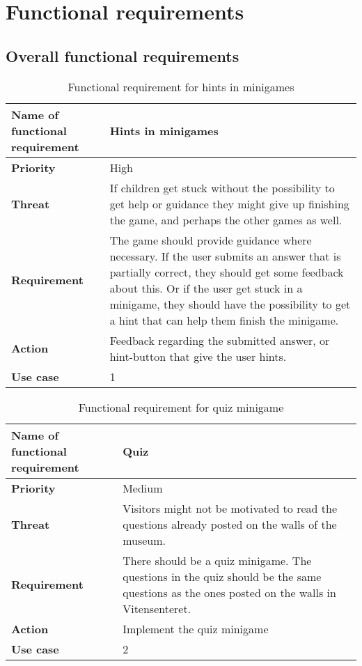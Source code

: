\section{Functional requirements}


\subsection{Overall functional requirements}
\begin{table}[!h]
\caption{Functional requirement for hints in minigames}
\begin{tabular}{ |p{7cm}|p{7cm}| }
\hline
\textbf {Name of functional requirement} & {Hints in minigames} \\ \hline
\textbf {Priority} & {High} \\ \hline
\textbf {Threat} & { If children get stuck without the possibility to get help or guidance they might give up finishing the game, and perhaps the other games as well.} \\ \hline
\textbf {Requirement} & {The game should provide guidance where necessary. If the user submits an answer that is partially correct, they should get some feedback about this. Or if the user get stuck in a minigame, they should have the possibility to get a hint that can help them finish the minigame.} \\ \hline
\textbf {Action} & {Feedback regarding the submitted answer, or hint-button that give the user hints.} \\ \hline
\textbf {Use case} & {1} \\ \hline
\end{tabular}
\end{table}

\begin{table}[!h]
\caption{Functional requirement for quiz minigame }
\begin{tabular}{ |p{7cm}|p{7cm}| }
\hline
\textbf {Name of functional requirement} & {Quiz} \\ \hline
\textbf {Priority} & {Medium} \\ \hline
\textbf {Threat} & {Visitors might not be motivated to read the questions already posted on the walls of the museum. } \\ \hline
\textbf {Requirement} & {There should be a quiz minigame. The questions in the quiz should be the same questions as the ones posted on the walls in Vitensenteret.} \\ \hline
\textbf {Action} & {Implement the quiz minigame} \\ \hline
\textbf {Use case} & {2} \\ \hline
\end{tabular}
\end{table}

